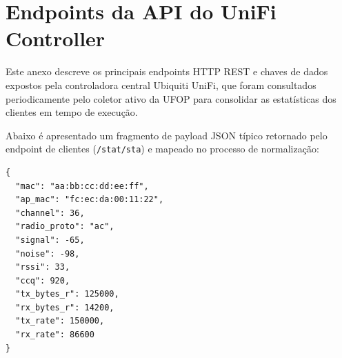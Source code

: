 \chapter{Endpoints da API do UniFi Controller}
\label{an:api_unifi}

Este anexo descreve os principais endpoints HTTP REST e chaves de dados expostos pela controladora central Ubiquiti UniFi, que foram consultados periodicamente pelo coletor ativo da UFOP para consolidar as estatísticas dos clientes em tempo de execução.

\begin{table}[htb]
\end{table}

Abaixo é apresentado um fragmento de payload JSON típico retornado pelo endpoint de clientes (\texttt{/stat/sta}) e mapeado no processo de normalização:

\begin{lstlisting}[caption={Fragmento de Payload JSON do UniFi Controller STA}, label={lst:json_unifi}]
{
  "mac": "aa:bb:cc:dd:ee:ff",
  "ap_mac": "fc:ec:da:00:11:22",
  "channel": 36,
  "radio_proto": "ac",
  "signal": -65,
  "noise": -98,
  "rssi": 33,
  "ccq": 920,
  "tx_bytes_r": 125000,
  "rx_bytes_r": 14200,
  "tx_rate": 150000,
  "rx_rate": 86600
}
\end{lstlisting}
